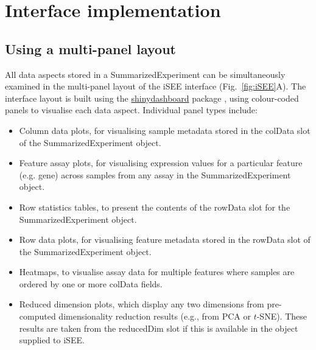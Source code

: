 \documentclass[10pt,a4paper,twocolumn]{article}
\begin{document}
\section*{Interface implementation}

\subsection*{Using a multi-panel layout}
All data aspects stored in a SummarizedExperiment can be simultaneously examined in the multi-panel layout of the iSEE interface (Fig.~\ref{fig:iSEE}A).
The interface layout is built using the \href{https://rstudio.github.io/shinydashboard/}{shinydashboard} package \citep{chang2018shinydashboard}, using colour-coded panels to visualise each data aspect.
Individual panel types include:

\begin{itemize}
\item Column data plots, for visualising sample metadata stored in the colData slot of the SummarizedExperiment object.
\item Feature assay plots, for visualising expression values for a particular feature (e.g. gene) across samples from any assay in the SummarizedExperiment object.
\item Row statistics tables, to present the contents of the rowData slot for the SummarizedExperiment object.
\item Row data plots, for visualising feature metadata stored in the rowData slot of the SummarizedExperiment object.
\item Heatmaps, to visualise assay data for multiple features where samples are ordered by one or more colData fields.
\item Reduced dimension plots, which display any two dimensions from pre-computed dimensionality reduction results (e.g., from PCA or $t$-SNE).
These results are taken from the reducedDim slot if this is available in the object supplied to iSEE.
\end{itemize}
\end{document}
